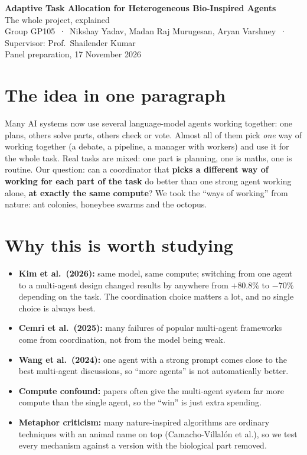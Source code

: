 \documentclass[11pt,a4paper]{article}
\begin{document}
\begin{center}
{\LARGE\bfseries\color{ink} Adaptive Task Allocation for Heterogeneous Bio-Inspired Agents}\\[0.4em]
{\large The whole project, explained}\\[0.3em]
{\small Group GP105 \,·\, Nikshay Yadav, Madan Raj Murugesan, Aryan Varshney \,·\, Supervisor: Prof.\ Shailender Kumar}\\[0.2em]
{\small Panel preparation, 17 November 2026}
\end{center}

\section{The idea in one paragraph}
Many AI systems now use several language-model agents working together: one plans, others solve parts,
others check or vote. Almost all of them pick \emph{one} way of working together (a debate, a pipeline, a
manager with workers) and use it for the whole task. Real tasks are mixed: one part is planning, one is
maths, one is routine. Our question: can a coordinator that \textbf{picks a different way of working for
each part of the task} do better than one strong agent working alone, \textbf{at exactly the same
compute}? We took the ``ways of working'' from nature: ant colonies, honeybee swarms and the octopus.

\section{Why this is worth studying}
\begin{itemize}
  \item \textbf{Kim et al.\ (2026):} same model, same compute; switching from one agent to a multi-agent
        design changed results by anywhere from $+80.8\%$ to $-70\%$ depending on the task. The
        coordination choice matters a lot, and no single choice is always best.
  \item \textbf{Cemri et al.\ (2025):} many failures of popular multi-agent frameworks come from
        coordination, not from the model being weak.
  \item \textbf{Wang et al.\ (2024):} one agent with a strong prompt comes close to the best
        multi-agent discussions, so ``more agents'' is not automatically better.
  \item \textbf{Compute confound:} papers often give the multi-agent system far more compute than the
        single agent, so the ``win'' is just extra spending.
  \item \textbf{Metaphor criticism:} many nature-inspired algorithms are ordinary techniques with an
        animal name on top (Camacho-Villal\'on et al.), so we test every mechanism against a version
        with the biological part removed.
\end{itemize}
\end{document}
